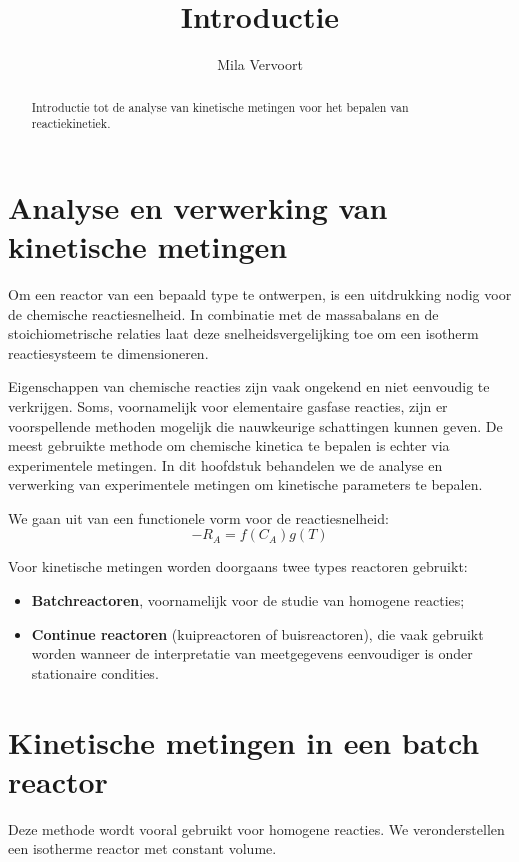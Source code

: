 \documentclass{ximera}
\title{Introductie}
\author{Mila Vervoort}
\begin{document}
\begin{abstract}
    Introductie tot de analyse van kinetische metingen voor het bepalen van reactiekinetiek.
\end{abstract}
\maketitle
\label{xim:Introductie analysemethode}

\section*{Analyse en verwerking van kinetische metingen}

Om een reactor van een bepaald type te ontwerpen, is een uitdrukking nodig voor de chemische reactiesnelheid. In combinatie met de massabalans en de stoichiometrische relaties laat deze snelheidsvergelijking toe om een isotherm reactiesysteem te dimensioneren.

Eigenschappen van chemische reacties zijn vaak ongekend en niet eenvoudig te verkrijgen. Soms, voornamelijk voor elementaire gasfase reacties, zijn er voorspellende methoden mogelijk die nauwkeurige schattingen kunnen geven. De meest gebruikte methode om chemische kinetica te bepalen is echter via
experimentele metingen. In dit hoofdstuk behandelen we de analyse
en verwerking van experimentele metingen om kinetische parameters te bepalen.

We gaan uit van een functionele vorm voor de reactiesnelheid:
\[-R_A = f(C_A)g(T)\]

Voor kinetische metingen worden doorgaans twee types reactoren gebruikt:
\begin{itemize}
\item \textbf{Batchreactoren}, voornamelijk voor de studie van homogene reacties;
\item \textbf{Continue reactoren} (kuipreactoren of buisreactoren), die vaak gebruikt worden wanneer de interpretatie van meetgegevens eenvoudiger is onder stationaire condities.
\end{itemize}


\section*{Kinetische metingen in een batch reactor}
\label{Kinetische metingen in een batch reactor}

Deze methode wordt vooral gebruikt voor homogene reacties. We veronderstellen een isotherme reactor met constant volume.
\end{document}
